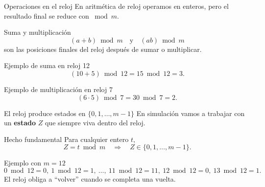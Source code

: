 \documentclass[aspectratio=1610, 9pt]{beamer}
\begin{document}
\begin{frame}{Operaciones en el reloj}
    En aritmética de reloj operamos en enteros, pero el resultado final se reduce con $\bmod m$.

    \vspace{0.25cm}
    \begin{block}{Suma y multiplicación}
    \[
    (a+b)\bmod m \quad \text{y} \quad (ab)\bmod m
    \]
    son las posiciones finales del reloj después de sumar o multiplicar.
    \end{block}

    \vspace{0.25cm}
    \begin{exampleblock}{Ejemplo de suma en reloj 12}
        \[
        (10+5)\bmod 12 = 15\bmod 12 = 3.
        \]
    \end{exampleblock}

    \vspace{0.15cm}
    \begin{exampleblock}{Ejemplo de multiplicación en reloj 7}
        \[
        (6\cdot 5)\bmod 7 = 30\bmod 7 = 2.
        \]
    \end{exampleblock}
\end{frame}

\begin{frame}{El reloj produce estados en $\{0,1,\dots,m-1\}$}
    En simulación vamos a trabajar con un \textbf{estado} $Z$ que siempre viva dentro del reloj.

    \vspace{0.25cm}
    \begin{block}{Hecho fundamental}
    Para cualquier entero $t$,
    \[
    Z = t \bmod m \quad \Rightarrow \quad Z\in\{0,1,\dots,m-1\}.
    \]
    \end{block}

    \vspace{0.25cm}
    \begin{exampleblock}{Ejemplo con $m=12$}
        \[
        0\bmod 12=0,\ 1\bmod 12=1,\ \dots,\ 11\bmod 12=11,\ 12\bmod 12=0,\ 13\bmod 12=1.
        \]
        El reloj obliga a ``volver'' cuando se completa una vuelta.
    \end{exampleblock}
\end{frame}
\end{document}

